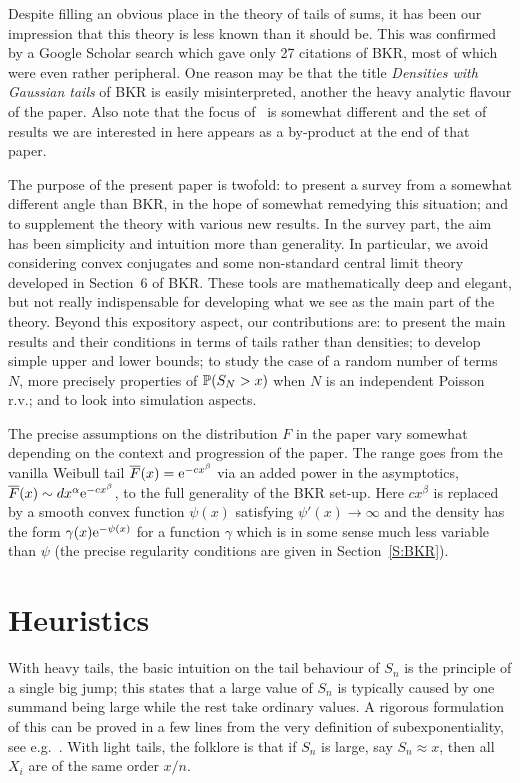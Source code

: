 Despite filling an obvious place in the theory of  tails of sums, it has been our impression that this theory is less known
than it should be. This was confirmed by a Google Scholar search which gave only 27 citations of BKR,
most of which were even rather peripheral.
One reason may be that the title \emph{Densities with Gaussian tails} of BKR is easily misinterpreted,
another the heavy analytic flavour of the paper. Also note that the focus of~\cite{Rootzen} is somewhat different and
the set of results we are interested in here appears as a by-product at the end of that paper.

The purpose of the present paper is twofold: to present a survey from a somewhat different angle than BKR, in the 
hope of somewhat remedying this situation; and to supplement the theory with various new results.
In the survey part, the aim has been  simplicity and intuition more than generality.
In particular, we avoid considering convex conjugates and some non-standard
central limit theory developed in Section~6 of BKR. These tools are mathematically deep and elegant, but
not really indispensable for developing what we see as the main part of the theory.
Beyond this expository aspect, our contributions are: to present the main results and their conditions
in terms of  tails rather than densities;  to develop simple upper and lower
bounds; to study the case of a random
number of terms $N$, more precisely properties of $\mathbb{P}(S_N>x)$
when $N$ is an independent Poisson r.v.; and to look into simulation
aspects.

The precise assumptions on the distribution $F$ in the paper vary somewhat depending on the context and progression of
the paper. The range goes from the vanilla Weibull tail $\overline F(x)=\mathrm{e}^{-cx^\beta}$ via an added power in the asymptotics,
$\overline F(x)\sim dx^{\alpha}\mathrm{e}^{-cx^\beta}$, to the full generality of the BKR set-up. Here $cx^\beta$ is replaced by a smooth convex
function $\psi(x)$ satisfying $\psi'(x)\to\infty$ and the density has the form $\gamma(x)\mathrm{e}^{-\psi(x)}$ for a function $\gamma$ which
is in some sense much less variable than $\psi$ (the precise regularity conditions are given in Section~\ref{S:BKR}).

\section{Heuristics}\label{S:Heur}

With heavy tails, the basic intuition on the tail behaviour of $S_n$ is the principle of
a single big jump; this states that a large value of $S_n$ is typically caused by
one summand being large while the rest take ordinary values.
A rigorous formulation of this can be proved in a few lines from the very definition
of subexponentiality, see e.g.~\cite[p.\,294]{asmussen2010ruin}. With light tails, the folklore is that if
$S_n$ is large, say $S_n\approx x$, then all $X_i$ are of the same order $x/n$.

